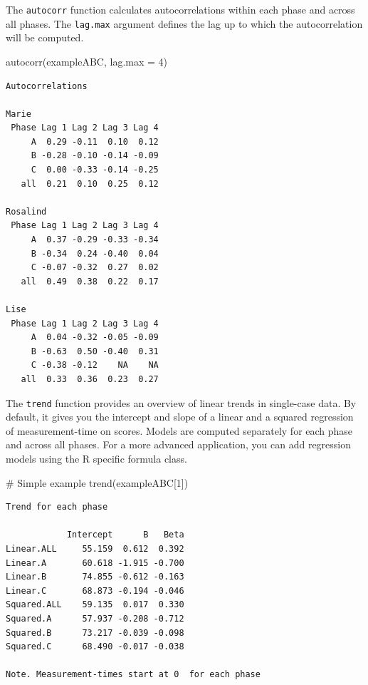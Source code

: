 \documentclass[
  letterpaper,
  DIV=11,
  numbers=noendperiod]{scrreprt}
\newenvironment{Shaded}{\begin{snugshade}}{\end{snugshade}}
\newcommand{\AttributeTok}[1]{\textcolor[rgb]{0.40,0.45,0.13}{#1}}
\newcommand{\CommentTok}[1]{\textcolor[rgb]{0.37,0.37,0.37}{#1}}
\newcommand{\DecValTok}[1]{\textcolor[rgb]{0.68,0.00,0.00}{#1}}
\newcommand{\FunctionTok}[1]{\textcolor[rgb]{0.28,0.35,0.67}{#1}}
\newcommand{\NormalTok}[1]{\textcolor[rgb]{0.00,0.23,0.31}{#1}}
\begin{document}
The \texttt{autocorr} function calculates autocorrelations within each
phase and across all phases. The \texttt{lag.max} argument defines the
lag up to which the autocorrelation will be computed.

\begin{Shaded}
\begin{Highlighting}[]
\FunctionTok{autocorr}\NormalTok{(exampleABC, }\AttributeTok{lag.max =} \DecValTok{4}\NormalTok{)}
\end{Highlighting}
\end{Shaded}

\begin{verbatim}
Autocorrelations

Marie 
 Phase Lag 1 Lag 2 Lag 3 Lag 4
     A  0.29 -0.11  0.10  0.12
     B -0.28 -0.10 -0.14 -0.09
     C  0.00 -0.33 -0.14 -0.25
   all  0.21  0.10  0.25  0.12

Rosalind 
 Phase Lag 1 Lag 2 Lag 3 Lag 4
     A  0.37 -0.29 -0.33 -0.34
     B -0.34  0.24 -0.40  0.04
     C -0.07 -0.32  0.27  0.02
   all  0.49  0.38  0.22  0.17

Lise 
 Phase Lag 1 Lag 2 Lag 3 Lag 4
     A  0.04 -0.32 -0.05 -0.09
     B -0.63  0.50 -0.40  0.31
     C -0.38 -0.12    NA    NA
   all  0.33  0.36  0.23  0.27
\end{verbatim}

The \texttt{trend} function provides an overview of linear trends in
single-case data. By default, it gives you the intercept and slope of a
linear and a squared regression of measurement-time on scores. Models
are computed separately for each phase and across all phases. For a more
advanced application, you can add regression models using the R specific
formula class.

\begin{Shaded}
\begin{Highlighting}[]
\CommentTok{\# Simple example}
\FunctionTok{trend}\NormalTok{(exampleABC[}\DecValTok{1}\NormalTok{])}
\end{Highlighting}
\end{Shaded}

\begin{verbatim}
Trend for each phase

            Intercept      B   Beta
Linear.ALL     55.159  0.612  0.392
Linear.A       60.618 -1.915 -0.700
Linear.B       74.855 -0.612 -0.163
Linear.C       68.873 -0.194 -0.046
Squared.ALL    59.135  0.017  0.330
Squared.A      57.937 -0.208 -0.712
Squared.B      73.217 -0.039 -0.098
Squared.C      68.490 -0.017 -0.038

Note. Measurement-times start at 0  for each phase
\end{verbatim}
\end{document}
